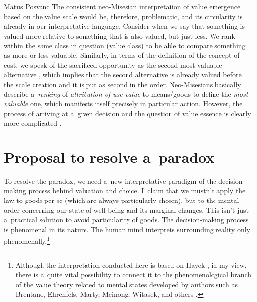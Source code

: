 \begin{artengenv}{Matus Posvanc}
The consistent neo-Misesian interpretation of value emergence based on the value scale would be, therefore, problematic, and its circularity is already in our interpretative language. Consider when we say that something is valued more relative to something that is also valued, but just less. We rank within the same class in question (value class) to be able to compare something as more or less valuable. Similarly, in terms of the definition of the concept of cost, we speak of the sacrificed opportunity as the second most valuable alternative 
\parencite[or ``the next most urgent want''][p.174]{Mises2003Epistemological}, %
 which implies that the second alternative is already valued before the scale creation and it is put as second in the order. Neo-Misesians basically describe a~\textit{ranking} of \textit{attribution of use value} to means/goods to define the \textit{most valuable} one, which manifests itself precisely in particular action. However, the process of arriving at a~given decision and the question of value essence is clearly more complicated 
\parencites[see also][pp.45–46]{ODriscoll1996Austrian}[][]{Grassl2017Toward}.%




\section{Proposal to resolve a~paradox }



To resolve the paradox, we need a~new interpretative paradigm of the decision-making process behind valuation and choice. I~claim that we mustn't apply the law to goods per se (which are always particularly chosen), but to the mental order concerning our state of well-being and its marginal changes. This isn't just a~practical solution to avoid particularity of goods. The decision-making process is phenomenal in its nature. The human mind interprets surrounding reality only phenomenally.\footnote{Although the interpretation conducted here is based on Hayek 
\parencite*[][]{Hayek1952Sensory}, %
 in my view, there is a~quite vital possibility to connect it to the phenomenological branch of the value theory related to mental states developed by authors such as Brentano, Ehrenfels, Marty, Meinong, Witasek, and others 
\parencites[see][]{Smith1994Austrian}[][]{Grassl2017Toward}.%
}




\end{artengenv}
